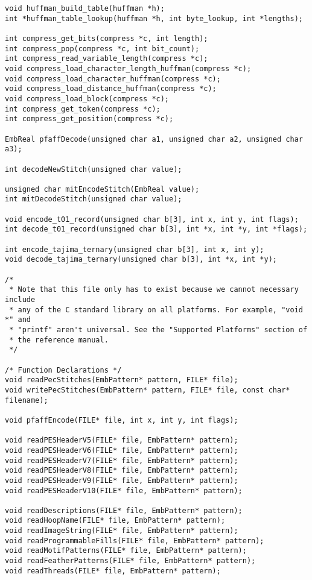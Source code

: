 \begin{lstlisting}
void huffman_build_table(huffman *h);
int *huffman_table_lookup(huffman *h, int byte_lookup, int *lengths);

int compress_get_bits(compress *c, int length);
int compress_pop(compress *c, int bit_count);
int compress_read_variable_length(compress *c);
void compress_load_character_length_huffman(compress *c);
void compress_load_character_huffman(compress *c);
void compress_load_distance_huffman(compress *c);
void compress_load_block(compress *c);
int compress_get_token(compress *c);
int compress_get_position(compress *c);

EmbReal pfaffDecode(unsigned char a1, unsigned char a2, unsigned char a3);

int decodeNewStitch(unsigned char value);

unsigned char mitEncodeStitch(EmbReal value);
int mitDecodeStitch(unsigned char value);

void encode_t01_record(unsigned char b[3], int x, int y, int flags);
int decode_t01_record(unsigned char b[3], int *x, int *y, int *flags);

int encode_tajima_ternary(unsigned char b[3], int x, int y);
void decode_tajima_ternary(unsigned char b[3], int *x, int *y);

/*
 * Note that this file only has to exist because we cannot necessary include
 * any of the C standard library on all platforms. For example, "void *" and
 * "printf" aren't universal. See the "Supported Platforms" section of
 * the reference manual.
 */

/* Function Declarations */
void readPecStitches(EmbPattern* pattern, FILE* file);
void writePecStitches(EmbPattern* pattern, FILE* file, const char* filename);

void pfaffEncode(FILE* file, int x, int y, int flags);

void readPESHeaderV5(FILE* file, EmbPattern* pattern);
void readPESHeaderV6(FILE* file, EmbPattern* pattern);
void readPESHeaderV7(FILE* file, EmbPattern* pattern);
void readPESHeaderV8(FILE* file, EmbPattern* pattern);
void readPESHeaderV9(FILE* file, EmbPattern* pattern);
void readPESHeaderV10(FILE* file, EmbPattern* pattern);

void readDescriptions(FILE* file, EmbPattern* pattern);
void readHoopName(FILE* file, EmbPattern* pattern);
void readImageString(FILE* file, EmbPattern* pattern);
void readProgrammableFills(FILE* file, EmbPattern* pattern);
void readMotifPatterns(FILE* file, EmbPattern* pattern);
void readFeatherPatterns(FILE* file, EmbPattern* pattern);
void readThreads(FILE* file, EmbPattern* pattern);


\end{lstlisting}
